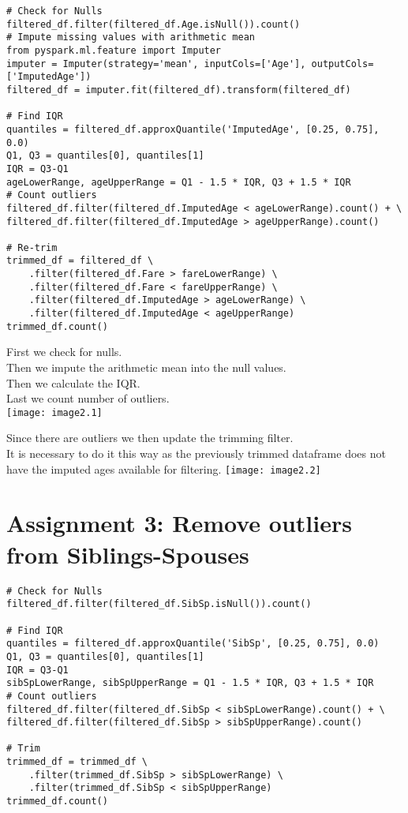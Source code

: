 \documentclass[]{article}
\begin{document}
\begin{verbatim}
# Check for Nulls
filtered_df.filter(filtered_df.Age.isNull()).count()
# Impute missing values with arithmetic mean
from pyspark.ml.feature import Imputer
imputer = Imputer(strategy='mean', inputCols=['Age'], outputCols=['ImputedAge'])
filtered_df = imputer.fit(filtered_df).transform(filtered_df)

# Find IQR 
quantiles = filtered_df.approxQuantile('ImputedAge', [0.25, 0.75], 0.0)
Q1, Q3 = quantiles[0], quantiles[1]
IQR = Q3-Q1
ageLowerRange, ageUpperRange = Q1 - 1.5 * IQR, Q3 + 1.5 * IQR
# Count outliers
filtered_df.filter(filtered_df.ImputedAge < ageLowerRange).count() + \
filtered_df.filter(filtered_df.ImputedAge > ageUpperRange).count()

# Re-trim
trimmed_df = filtered_df \
	.filter(filtered_df.Fare > fareLowerRange) \
	.filter(filtered_df.Fare < fareUpperRange) \
	.filter(filtered_df.ImputedAge > ageLowerRange) \
	.filter(filtered_df.ImputedAge < ageUpperRange)
trimmed_df.count()
\end{verbatim}
First we check for nulls. \\
Then we impute the arithmetic mean into the null values. \\
Then we calculate the IQR. \\
Last we count number of outliers. \\ 
\texttt{[image: image2.1]}

Since there are outliers we then update the trimming filter. \\
It is necessary to do it this way as the previously trimmed dataframe does not have the imputed ages available for filtering.
\texttt{[image: image2.2]}


\section*{Assignment 3: Remove outliers from Siblings-Spouses}

\begin{verbatim}
# Check for Nulls
filtered_df.filter(filtered_df.SibSp.isNull()).count()

# Find IQR 
quantiles = filtered_df.approxQuantile('SibSp', [0.25, 0.75], 0.0)
Q1, Q3 = quantiles[0], quantiles[1]
IQR = Q3-Q1
sibSpLowerRange, sibSpUpperRange = Q1 - 1.5 * IQR, Q3 + 1.5 * IQR
# Count outliers
filtered_df.filter(filtered_df.SibSp < sibSpLowerRange).count() + \
filtered_df.filter(filtered_df.SibSp > sibSpUpperRange).count()

# Trim
trimmed_df = trimmed_df \
	.filter(trimmed_df.SibSp > sibSpLowerRange) \
	.filter(trimmed_df.SibSp < sibSpUpperRange)
trimmed_df.count()
\end{verbatim}
\end{document}
